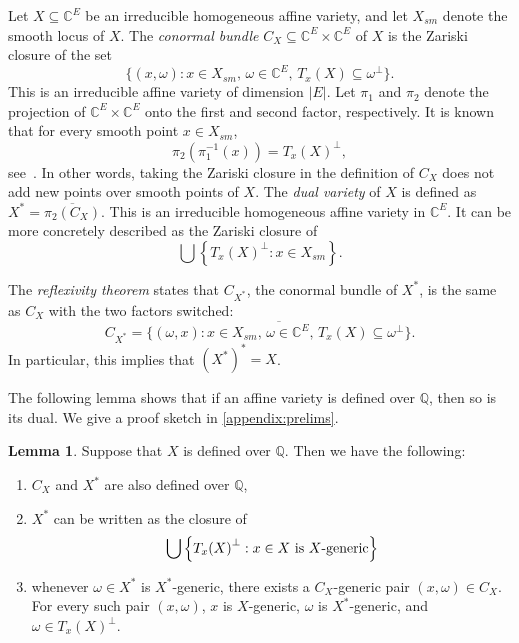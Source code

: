 \documentclass[11pt,a4paper,dvipsnames]{scrartcl}
\theoremstyle{definition}
\newtheorem{lemma}[theorem]{Lemma}
\newcommand{\CC}{\mathbb{C}}
\newcommand{\QQ}{\mathbb{Q}}
\begin{document}
Let $X \subseteq \CC^E$ be an irreducible homogeneous affine variety, and let $X_{sm}$ denote the smooth locus of $X$. The \emph{conormal bundle} $C_X \subseteq \CC^E \times \CC^E$ of $X$ is the Zariski closure
of the set
\[\{(x,\omega) : x \in X_{sm}, \, \omega \in \CC^E, \, T_x(X) \subseteq \omega^\perp\}.\]
This is an irreducible affine variety of dimension $|E|$. Let $\pi_1$ and $\pi_2$ denote the projection of $\CC^E \times \CC^E$ onto the first and second factor, respectively. It is known that for every smooth point $x \in X_{sm}$, 
\begin{equation}\label{eq:conormalprojection}
    \pi_2(\pi_1^{-1}(x)) = {T_x(X)}^{\perp},
\end{equation}
see~\cite[Section 2.1.4]{fischer.piontkowski_2001}.
In other words, taking the Zariski closure in the definition of $C_X$ does not add new points over smooth points of $X$. The \emph{dual variety} of $X$ is defined as $X^* = \overline{\pi_2(C_X)}$. This is an irreducible homogeneous affine variety in $\CC^E$. It can be more concretely described as the Zariski closure of 
\begin{equation}\label{eq:dualdescription}
    \bigcup \left\{{T_x(X)}^\perp: x \in X_{sm}\right\}. 
\end{equation}

The \emph{reflexivity theorem} states that $C_{X^*}$, the conormal bundle of $X^*$, is the same as $C_X$ with the two factors switched:
\[C_{X^*} = \overline{\{(\omega,x) :  x \in X_{sm}, \, \omega \in \CC^E, \, T_x(X) \subseteq \omega^\perp\}}.\]
In particular, this implies that ${(X^*)}^* = X$. 

The following lemma shows that if an affine variety is defined over $\QQ$, then so is its dual. 
We give a proof sketch in \cref{appendix:prelims}.
\begin{lemma}\label{lemma:dualoverQ}
    Suppose that $X$ is defined over $\QQ$. Then we have the following: 
    \begin{enumerate}
        \item $C_X$ and $X^*$ are also defined over $\QQ$,
        \item $X^*$ can be written as the closure of
    \begin{equation}\label{eq:genericclosure}
        \bigcup \left\{{T_x(X)}^\perp : x \in X \text{ is } X\text{-generic}\right\} \vspace{-.3em}
    \end{equation}
    \item     whenever $\omega \in X^*$ is $X^*$-generic, there exists a $C_X$-generic pair $(x,\omega) \in C_X$. For every such pair $(x,\omega)$, $x$ is $X$-generic, $\omega$ is $X^*$-generic, and $\omega \in {T_x(X)}^\perp$. 
    \end{enumerate}
\end{lemma}
\end{document}
